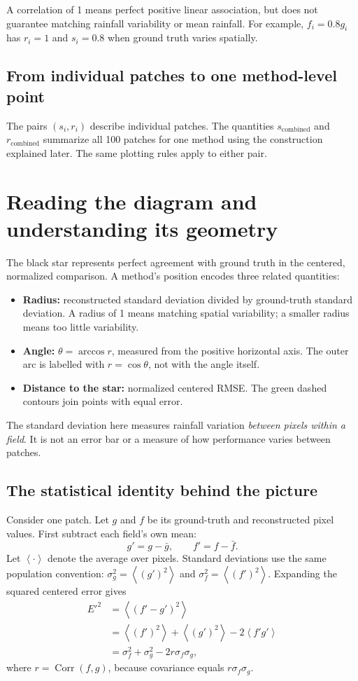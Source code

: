 \documentclass[11pt,a4paper]{article}
\newcommand{\avg}[1]{\left\langle #1\right\rangle}
\newcommand{\Corr}{\operatorname{Corr}}
\begin{document}
A correlation of 1 means perfect positive linear association, but does not guarantee matching rainfall variability or mean rainfall. For example, $f_i=0.8g_i$ has $r_i=1$ and $s_i=0.8$ when ground truth varies spatially.

\subsection*{From individual patches to one method-level point}
The pairs $(s_i,r_i)$ describe individual patches. The quantities $s_{\mathrm{combined}}$ and $r_{\mathrm{combined}}$ summarize all 100 patches for one method using the construction explained later. The same plotting rules apply to either pair.

\newpage
\section*{Reading the diagram and understanding its geometry}

The black star represents perfect agreement with ground truth in the centered, normalized comparison. A method's position encodes three related quantities:
\begin{itemize}
\item \textbf{Radius:} reconstructed standard deviation divided by ground-truth standard deviation. A radius of 1 means matching spatial variability; a smaller radius means too little variability.
\item \textbf{Angle:} $\theta=\arccos r$, measured from the positive horizontal axis. The outer arc is labelled with $r=\cos\theta$, not with the angle itself.
\item \textbf{Distance to the star:} normalized centered RMSE. The green dashed contours join points with equal error.
\end{itemize}

The standard deviation here measures rainfall variation \emph{between pixels within a field}. It is not an error bar or a measure of how performance varies between patches.

\subsection*{The statistical identity behind the picture}
Consider one patch. Let $g$ and $f$ be its ground-truth and reconstructed pixel values. First subtract each field's own mean:
\[
g'=g-\bar g,\qquad f'=f-\bar f.
\]
Let $\avg{\cdot}$ denote the average over pixels. Standard deviations use the same population convention: $\sigma_g^2=\avg{(g')^2}$ and $\sigma_f^2=\avg{(f')^2}$. Expanding the squared centered error gives
\begin{align*}
E'^2
 &=\avg{(f'-g')^2}\\
 &=\avg{(f')^2}+\avg{(g')^2}-2\avg{f'g'}\\
 &=\sigma_f^2+\sigma_g^2-2r\sigma_f\sigma_g,
\end{align*}
where $r=\Corr(f,g)$, because covariance equals $r\sigma_f\sigma_g$.
\end{document}
